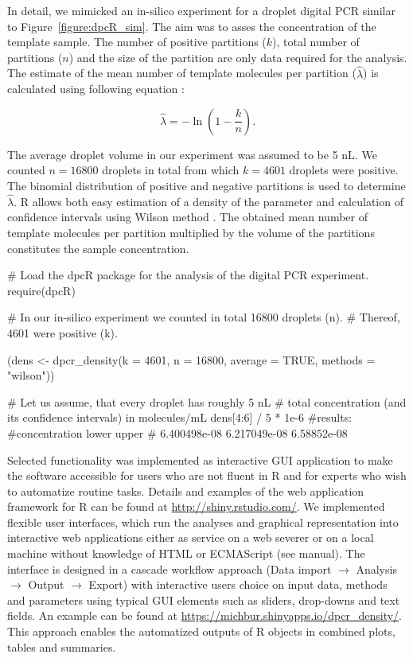In detail, we mimicked an in-silico experiment for a droplet digital PCR similar 
to Figure~\ref{figure:dpcR_sim}. The aim was to asses the concentration of the 
template sample. The number of positive partitions ($k$), total number of partitions 
($n$) and the size of the partition are only data required for the analysis. The estimate 
of the mean number of template molecules per partition ($\hat \lambda$) is calculated 
using following equation \citep{huggett_2013}:

\begin{equation}
\hat{\lambda} =  -\ln{(1 - \frac{k}{n})}.
\end{equation}

The average droplet volume in our experiment was assumed to be 5 nL. We counted 
$n = 16800$ droplets in total from which $k = 4601$ droplets were positive. 
The binomial distribution of positive and negative partitions is used to 
determine $\hat \lambda$. R allows both easy estimation of a density of
the parameter and calculation of confidence intervals using Wilson method \citep{brown_2001}. 
The obtained mean number of template molecules per partition multiplied
by the volume of the partitions constitutes the sample concentration.

\begin{example}
# Load the dpcR package for the analysis of the digital PCR experiment.
require(dpcR)

# In our in-silico experiment we counted in total 16800 droplets (n). 
# Thereof, 4601 were positive (k).

(dens <- dpcr_density(k = 4601, n = 16800, average = TRUE, methods = "wilson"))

# Let us assume, that every droplet has roughly 5 nL 
# total concentration (and its confidence intervals) in molecules/mL
dens[4:6] / 5 * 1e-6
#results: 
#concentration        lower       upper
# 6.400498e-08  6.217049e-08 6.58852e-08
\end{example}

Selected functionality was implemented as interactive  GUI 
application to make the software accessible for users who are not fluent in R 
and for experts who wish to automatize routine tasks. Details and examples of 
the  web application framework for R can be found at 
\url{http://shiny.rstudio.com/}. We implemented flexible user 
interfaces, which run the analyses and graphical representation into interactive 
web applications either as service on a web severer or on a local machine 
without knowledge of HTML or ECMAScript (see  manual). The 
interface is designed in a cascade workflow approach (Data import $\rightarrow$ 
Analysis $\rightarrow$ Output $\rightarrow$ Export) with interactive users 
choice on input data, methods and parameters using typical GUI elements such as 
sliders, drop-downs and text fields. An example can be found at 
\url{https://michbur.shinyapps.io/dpcr_density/}. This approach enables the 
automatized outputs of R objects in combined plots, tables and summaries.

